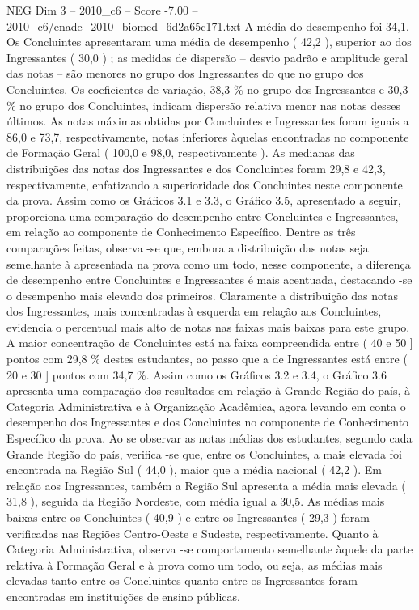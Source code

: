 \begin{textsample}{NEG Dim 3 – 2010\_c6 – Score -7.00 – 2010\_c6/enade\_2010\_biomed\_6d2a65c171.txt}
A média do desempenho foi 34,1.
Os Concluintes apresentaram uma média de desempenho ( 42,2 ), superior ao dos Ingressantes ( 30,0 ) ; as medidas de dispersão – desvio padrão e amplitude geral das notas – são menores no grupo dos Ingressantes do que no grupo dos Concluintes.
Os coeficientes de variação, 38,3 \% no grupo dos Ingressantes e 30,3 \% no grupo dos Concluintes, indicam dispersão relativa menor nas notas desses últimos.
As notas máximas obtidas por Concluintes e Ingressantes foram iguais a 86,0 e 73,7, respectivamente, notas inferiores àquelas encontradas no componente de Formação Geral ( 100,0 e 98,0, respectivamente ).
As medianas das distribuições das notas dos Ingressantes e dos Concluintes foram 29,8 e 42,3, respectivamente, enfatizando a superioridade dos Concluintes neste componente da prova.
Assim como os Gráficos 3.1 e 3.3, o Gráfico 3.5, apresentado a seguir, proporciona uma comparação do desempenho entre Concluintes e Ingressantes, em relação ao componente de Conhecimento Específico.
Dentre as três comparações feitas, observa -se que, embora a distribuição das notas seja semelhante à apresentada na prova como um todo, nesse componente, a diferença de desempenho entre Concluintes e Ingressantes é mais acentuada, destacando -se o desempenho mais elevado dos primeiros.
Claramente a distribuição das notas dos Ingressantes, mais concentradas à esquerda em relação aos Concluintes, evidencia o percentual mais alto de notas nas faixas mais baixas para este grupo.
A maior concentração de Concluintes está na faixa compreendida entre ( 40 e 50 ] pontos com 29,8 \% destes estudantes, ao passo que a de Ingressantes está entre ( 20 e 30 ] pontos com 34,7 \%.
Assim como os Gráficos 3.2 e 3.4, o Gráfico 3.6 apresenta uma comparação dos resultados em relação à Grande Região do país, à Categoria Administrativa e à Organização Acadêmica, agora levando em conta o desempenho dos Ingressantes e dos Concluintes no componente de Conhecimento Específico da prova.
Ao se observar as notas médias dos estudantes, segundo cada Grande Região do país, verifica -se que, entre os Concluintes, a mais elevada foi encontrada na Região Sul ( 44,0 ), maior que a média nacional ( 42,2 ).
Em relação aos Ingressantes, também a Região Sul apresenta a média mais elevada ( 31,8 ), seguida da Região Nordeste, com média igual a 30,5.
As médias mais baixas entre os Concluintes ( 40,9 ) e entre os Ingressantes ( 29,3 ) foram verificadas nas Regiões Centro-Oeste e Sudeste, respectivamente.
Quanto à Categoria Administrativa, observa -se comportamento semelhante àquele da parte relativa à Formação Geral e à prova como um todo, ou seja, as médias mais elevadas tanto entre os Concluintes quanto entre os Ingressantes foram encontradas em instituições de ensino públicas.

\end{textsample}
